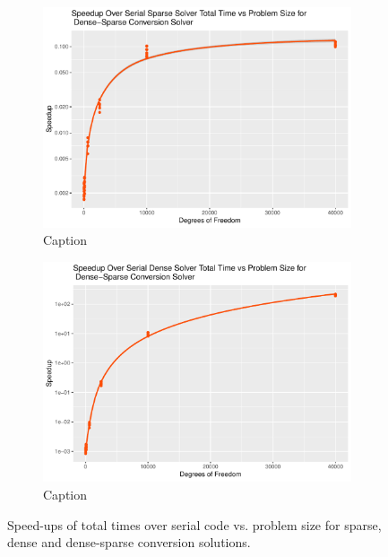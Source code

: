 \begin{figure}
\begin{subfigure}{0.48\linewidth}
		\includegraphics[width=\linewidth]{Plots/total_dnsspr_cpu_sparse_speedup_vs_n}
		\caption{Caption}
		\label{fig:tot_dnsspr_sparse}
	\end{subfigure}\hfill
	\begin{subfigure}{0.48\linewidth}
		\centering
		\includegraphics[width=\linewidth]{Plots/total_dnsspr_cpu_dense_speedup_vs_n}
		\caption{Caption}
		\label{fig:tot_dnsspr_dense}
	\end{subfigure}
	\caption{Speed-ups of total times over serial code vs. problem size for sparse, dense and dense-sparse conversion solutions.}
	\label{fig:tot}
\end{figure}

